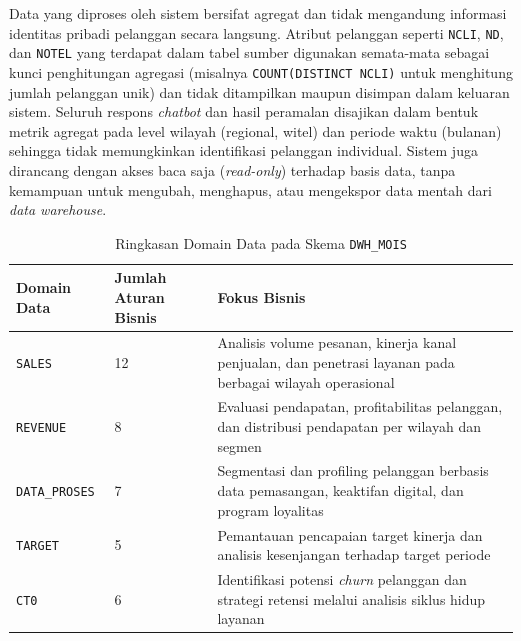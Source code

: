 Data yang diproses oleh sistem bersifat agregat dan tidak mengandung informasi identitas pribadi pelanggan secara langsung. Atribut pelanggan seperti \texttt{NCLI}, \texttt{ND}, dan \texttt{NOTEL} yang terdapat dalam tabel sumber digunakan semata-mata sebagai kunci penghitungan agregasi (misalnya \texttt{COUNT(DISTINCT NCLI)} untuk menghitung jumlah pelanggan unik) dan tidak ditampilkan maupun disimpan dalam keluaran sistem. Seluruh respons \textit{chatbot} dan hasil peramalan disajikan dalam bentuk metrik agregat pada level wilayah (regional, witel) dan periode waktu (bulanan) sehingga tidak memungkinkan identifikasi pelanggan individual. Sistem juga dirancang dengan akses baca saja (\textit{read-only}) terhadap basis data, tanpa kemampuan untuk mengubah, menghapus, atau mengekspor data mentah dari \textit{data warehouse}.

\begin{table}[htbp]
\centering
\caption{Ringkasan Domain Data pada Skema \texttt{DWH\_MOIS}}
\label{tab:ringkasan-domain}
\begin{tabular}{|p{3.5cm}|p{3.5cm}|p{5cm}|}
\hline
\textbf{Domain Data} & \textbf{Jumlah Aturan Bisnis} & \textbf{Fokus Bisnis} \\
\hline
\texttt{SALES} & 12 & Analisis volume pesanan, kinerja kanal penjualan, dan penetrasi layanan pada berbagai wilayah operasional \\
\hline
\texttt{REVENUE} & 8 & Evaluasi pendapatan, profitabilitas pelanggan, dan distribusi pendapatan per wilayah dan segmen \\
\hline
\texttt{DATA\_PROSES} & 7 & Segmentasi dan profiling pelanggan berbasis data pemasangan, keaktifan digital, dan program loyalitas \\
\hline
\texttt{TARGET} & 5 & Pemantauan pencapaian target kinerja dan analisis kesenjangan terhadap target periode \\
\hline
\texttt{CT0} & 6 & Identifikasi potensi \textit{churn} pelanggan dan strategi retensi melalui analisis siklus hidup layanan \\
\hline
\end{tabular}
\end{table}

